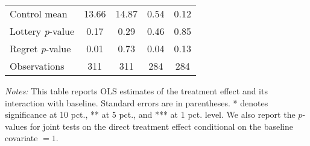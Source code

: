 \begin{table}[ht]
{\begin{threeparttable}
\begin{tabular}{l*{4}{c}}
Control mean    &    13.66         &    14.87         &     0.54         &     0.12         \\
Lottery \emph{p}-value&     0.17         &     0.29         &     0.46         &     0.85         \\
Regret \emph{p}-value&     0.01         &     0.73         &     0.04         &     0.13         \\
Observations    &      311         &      311         &      284         &      284         \\
\bottomrule \end{tabular} \begin{tablenotes}[flushleft] \footnotesize \item \emph{Notes:} This table reports OLS estimates of the treatment effect and its interaction with baseline. Standard errors are in parentheses. * denotes significance at 10 pct., ** at 5 pct., and *** at 1 pct. level. We also report the \(p\)-values for joint tests on the direct treatment effect conditional on the baseline covariate $= 1$. \end{tablenotes} \end{threeparttable} } \end{table}

